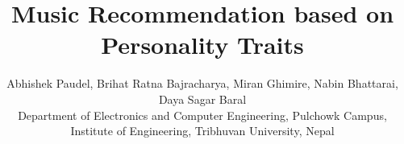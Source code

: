 \documentclass[journal]{IEEEtran}
\begin{document}
%
\title{Music Recommendation based on Personality Traits}



%
%

\author
{Abhishek Paudel, Brihat Ratna Bajracharya, Miran Ghimire, Nabin Bhattarai, Daya Sagar Baral\\
Department of Electronics and Computer Engineering, Pulchowk Campus,\\
Institute of Engineering, Tribhuvan University, Nepal
}

% 
%
\end{document}
